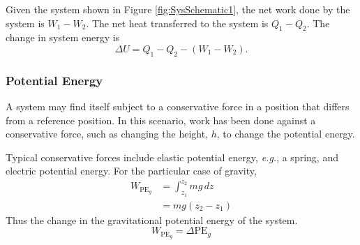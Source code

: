 Given the system shown in Figure \ref{fig:SysSchematic1}, the net work done by the system is $W_1-W_2$. The net heat transferred to the system is $Q_1-Q_2$. The change in system energy is
\begin{equation}
\Delta U = Q_1-Q_2-(W_1-W_2).
\end{equation}
\subsubsection{Potential Energy}
A system may find itself subject to a conservative force in a position that differs from a reference position.  In this scenario, work has been done against a conservative force, such as changing the height, $h$, to change the potential energy.

\begin{figure}[h]
\begin{center}
\end{center}
\end{figure}
\noindent Typical conservative forces include elastic potential energy, \emph{e.g.}, a spring, and electric potential energy. For the particular case of gravity,
\begin{equation}\label{eq:PE}
\begin{split}
W_{\text{PE}_g}&=\int_{z_1}^{z_2}mg\,dz\\
&=mg(z_2-z_1)
\end{split}
\end{equation}
Thus the change in the gravitational potential energy of the system.
\begin{equation}
    W_{\text{PE}_g}=\Delta \text{PE}_g 
\end{equation}


